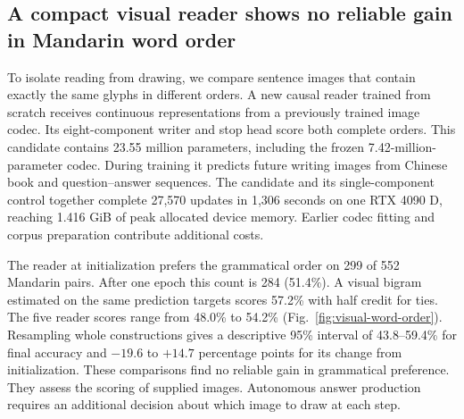 \subsection*{A compact visual reader shows no reliable gain in Mandarin word order}
To isolate reading from drawing, we compare sentence images that contain
exactly the same glyphs in different orders. A new causal reader trained from
scratch receives continuous representations from a previously trained image
codec. Its eight-component writer and stop head score both complete orders.
This candidate contains 23.55 million parameters, including the frozen
7.42-million-parameter codec. During training it predicts future writing images
from Chinese book and question--answer sequences. The candidate and its
single-component control together complete 27,570 updates in 1,306 seconds on
one RTX 4090 D, reaching 1.416 GiB of peak allocated device memory. Earlier
codec fitting and corpus preparation contribute additional costs.

The reader at initialization prefers the grammatical order on 299 of 552
Mandarin pairs. After one epoch this count is 284 (51.4\%).
A visual bigram estimated on the same prediction targets scores 57.2\% with
half credit for ties. The five reader scores range from 48.0\% to 54.2\%
(Fig.~\ref{fig:visual-word-order}). Resampling whole constructions gives a
descriptive 95\% interval of 43.8--59.4\% for final accuracy and
$-19.6$ to $+14.7$ percentage points for its change from initialization.
These comparisons find no reliable gain in grammatical preference. They
assess the scoring of supplied images. Autonomous answer production requires
an additional decision about which image to draw at each step.
